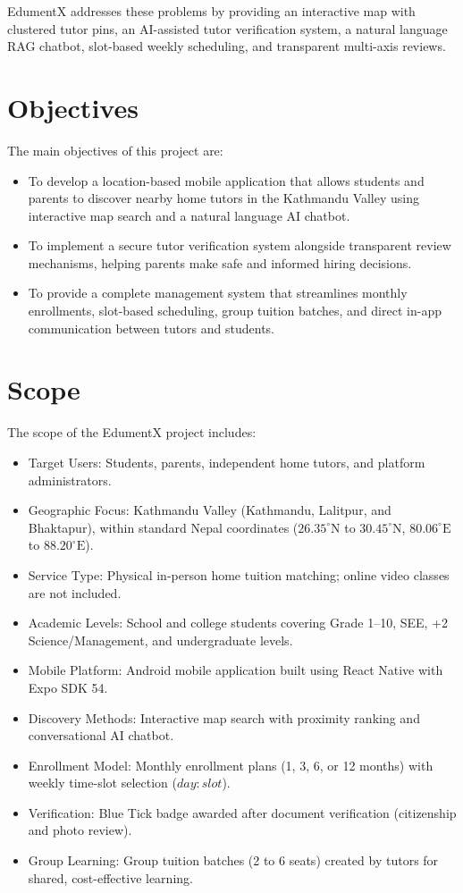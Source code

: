 \documentclass[12pt]{report}
\begin{document}
EdumentX addresses these problems by providing an interactive map with clustered tutor pins, an AI-assisted tutor verification system, a natural language RAG chatbot, slot-based weekly scheduling, and transparent multi-axis reviews.
\newpage
\section{Objectives}
The main objectives of this project are:
\begin{itemize}
\item To develop a location-based mobile application that allows students and parents to discover nearby home tutors in the Kathmandu Valley using interactive map search and a natural language AI chatbot.
\item To implement a secure tutor verification system alongside transparent review mechanisms, helping parents make safe and informed hiring decisions.
\item To provide a complete management system that streamlines monthly enrollments, slot-based scheduling, group tuition batches, and direct in-app communication between tutors and students.
\end{itemize}

\section{Scope}
The scope of the EdumentX project includes:
\begin{itemize}
\item Target Users: Students, parents, independent home tutors, and platform administrators.
\item Geographic Focus: Kathmandu Valley (Kathmandu, Lalitpur, and Bhaktapur), within standard Nepal coordinates ($26.35^\circ\text{N}$ to $30.45^\circ\text{N}$, $80.06^\circ\text{E}$ to $88.20^\circ\text{E}$).
\item Service Type: Physical in-person home tuition matching; online video classes are not included.
\item Academic Levels: School and college students covering Grade 1--10, SEE, +2 Science/Management, and undergraduate levels.
\item Mobile Platform: Android mobile application built using React Native with Expo SDK 54.
\item Discovery Methods: Interactive map search with proximity ranking and conversational AI chatbot.
\item Enrollment Model: Monthly enrollment plans (1, 3, 6, or 12 months) with weekly time-slot selection ($day:slot$).
\item Verification: Blue Tick badge awarded after document verification (citizenship and photo review).
\item Group Learning: Group tuition batches (2 to 6 seats) created by tutors for shared, cost-effective learning.
\end{itemize}
\end{document}
